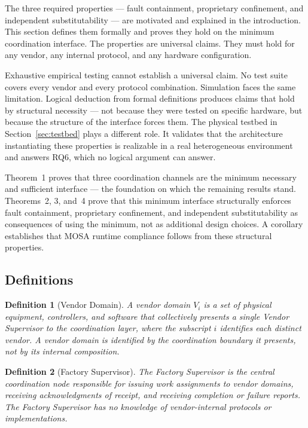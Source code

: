 \documentclass[a4paper,fleqn]{cas-dc}
\newtheorem{definition}{Definition}
\begin{document}
The three required properties — fault containment, proprietary confinement, and independent substitutability — are motivated and explained in the introduction. This section defines them formally and proves they hold on the minimum coordination interface. The properties are universal claims. They must hold for any vendor, any internal protocol, and any hardware configuration.

Exhaustive empirical testing cannot establish a universal claim. No test suite covers every vendor and every protocol combination. Simulation faces the same limitation. Logical deduction from formal definitions produces claims that hold by structural necessity — not because they were tested on specific hardware, but because the structure of the interface forces them. The physical testbed in Section~\ref{sec:testbed} plays a different role. It validates that the architecture instantiating these properties is realizable in a real heterogeneous environment and answers RQ6, which no logical argument can answer.

Theorem~1 proves that three coordination channels are the minimum necessary and sufficient interface — the foundation on which the remaining results stand. Theorems~2, 3, and~4 prove that this minimum interface structurally enforces fault containment, proprietary confinement, and independent substitutability as consequences of using the minimum, not as additional design choices. A corollary establishes that MOSA runtime compliance follows from these structural properties.

\subsection{Definitions}

\begin{definition}[Vendor Domain]
A vendor domain $V_i$ is a set of physical equipment, controllers, and software that collectively presents a single Vendor Supervisor to the coordination layer, where the subscript $i$ identifies each distinct vendor. A vendor domain is identified by the coordination boundary it presents, not by its internal composition.
\end{definition}

\begin{definition}[Factory Supervisor]
The Factory Supervisor is the central coordination node responsible for issuing work assignments to vendor domains, receiving acknowledgments of receipt, and receiving completion or failure reports. The Factory Supervisor has no knowledge of vendor-internal protocols or implementations.
\end{definition}
\end{document}
